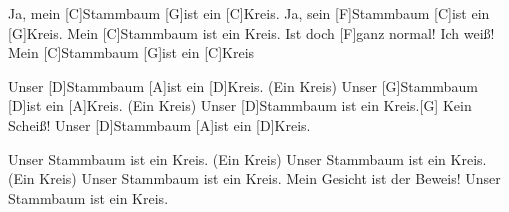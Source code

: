 \begin{guitar}
	\begin{highlightbar}
		Ja, mein [C]Stammbaum [G]ist ein [C]Kreis.
		Ja, sein [F]Stammbaum [C]ist ein [G]Kreis.
		Mein [C]Stammbaum ist ein Kreis. Ist doch [F]ganz normal! Ich weiß!
		Mein [C]Stammbaum [G]ist ein [C]Kreis
		
		Unser [D]Stammbaum [A]ist ein [D]Kreis. (Ein Kreis)
		Unser [G]Stammbaum [D]ist ein [A]Kreis. (Ein Kreis)
		Unser [D]Stammbaum ist ein Kreis.[G] Kein Scheiß!
		Unser [D]Stammbaum [A]ist ein [D]Kreis.
		
		Unser Stammbaum ist ein Kreis. (Ein Kreis)
		Unser Stammbaum ist ein Kreis. (Ein Kreis)
		Unser Stammbaum ist ein Kreis. Mein Gesicht ist der Beweis!
		Unser Stammbaum ist ein Kreis.
	\end{highlightbar}
\end{guitar}